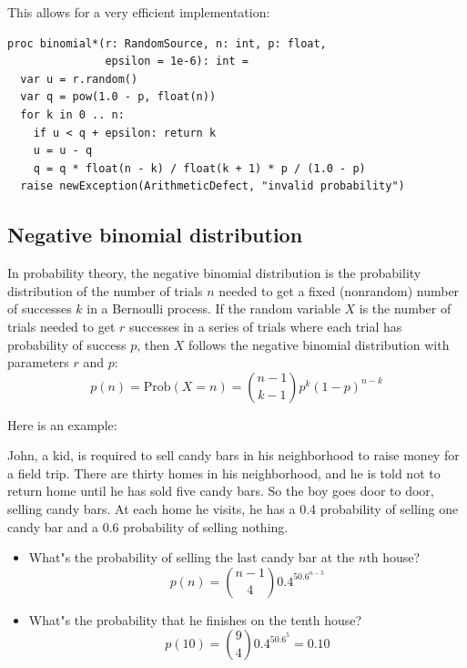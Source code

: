 \documentclass[justified, sixbynine]{tufte-book}
\def\ft{\small\tt}
\theoremstyle{plain}%
\newtheorem * {corollary}{Corollary}
\theoremstyle{definition}
\theoremstyle{remark}
\newtheorem * {remark}{Remark}
\newtheorem * {note}{Note}
\begin{document}
\begin{fullwidth}
This allows for a very efficient implementation:

\begin{lstlisting}[caption={in file: {\ft nlib/randomgen.nim}}]
proc binomial*(r: RandomSource, n: int, p: float,
               epsilon = 1e-6): int =
  var u = r.random()
  var q = pow(1.0 - p, float(n))
  for k in 0 .. n:
    if u < q + epsilon: return k
    u = u - q
    q = q * float(n - k) / float(k + 1) * p / (1.0 - p)
  raise newException(ArithmeticDefect, "invalid probability")
\end{lstlisting}


\goodbreak\subsection{Negative binomial distribution}

In probability theory, the negative binomial distribution is the probability
distribution of the number of trials $n$ needed to get a fixed
(nonrandom) number of successes $k$ in a Bernoulli process. If the random
variable $X$ is the number of trials needed to get $r$ successes in a series of
trials where each trial has probability of success $p$, then $X$ follows the
negative binomial distribution with parameters $r$ and $p$:
\begin{equation}
p(n)=\textrm{Prob}(X=n)=\binom{n-1}{k-1}p^k(1-p)^{n-k}
\end{equation}

Here is an example:

John, a kid, is required to sell candy bars in his neighborhood to
raise money for a field trip. There are thirty homes in his
neighborhood, and he is told not to return home until he has sold five candy bars.
So the boy goes door to door, selling candy bars. At each home he visits, he
has a 0.4 probability of selling one candy bar and a 0.6 probability of
selling nothing.

\begin{itemize}
\item  What"s the probability of selling the last candy bar at the $n$th house?
\begin{equation}
p(n)=\binom{n-1}40.4^50.6^{n-5}
\end{equation}

\item  What"s the probability that he finishes on the tenth house?
\begin{equation}
p(10)=\binom 940.4^50.6^5=0.10
\end{equation}


\end{itemize}
\end{fullwidth}
\end{document}
